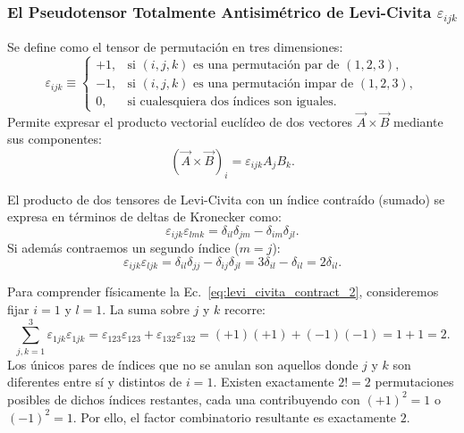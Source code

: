 \subsubsection{El Pseudotensor Totalmente Antisimétrico de Levi-Civita \texorpdfstring{$\varepsilon_{ijk}$}{epsilon\_ijk}}
Se define como el tensor de permutación en tres dimensiones:
\begin{equation}
    \varepsilon_{ijk} \equiv \begin{cases}
        +1, & \text{si } (i, j, k) \text{ es una permutación par de } (1, 2, 3), \\
        -1, & \text{si } (i, j, k) \text{ es una permutación impar de } (1, 2, 3), \\
        0,  & \text{si cualesquiera dos índices son iguales}.
    \end{cases}
\end{equation}
Permite expresar el producto vectorial euclídeo de dos vectores $\vec{A} \times \vec{B}$ mediante sus componentes:
\begin{equation}
    (\vec{A} \times \vec{B})_i = \varepsilon_{ijk} A_j B_k.
\end{equation}

\begin{teoremabox}
    El producto de dos tensores de Levi-Civita con un índice contraído (sumado) se expresa en términos de deltas de Kronecker como:
    \begin{equation}
        \boxed{\varepsilon_{ijk}\varepsilon_{lmk} = \delta_{il}\delta_{jm} - \delta_{im}\delta_{jl}}.
        \label{eq:levi_civita_contract_1}
    \end{equation}
    Si además contraemos un segundo índice ($m = j$):
    \begin{equation}
        \varepsilon_{ijk}\varepsilon_{ljk} = \delta_{il}\delta_{jj} - \delta_{ij}\delta_{jl} = 3\delta_{il} - \delta_{il} = \boxed{2\delta_{il}}.
        \label{eq:levi_civita_contract_2}
    \end{equation}
\end{teoremabox}

\begin{alertabox}
    Para comprender físicamente la Ec.~\eqref{eq:levi_civita_contract_2}, consideremos fijar $i = 1$ y $l = 1$. La suma sobre $j$ y $k$ recorre:
    \begin{equation}
        \sum_{j,k=1}^3 \varepsilon_{1jk}\varepsilon_{1jk} = \varepsilon_{123}\varepsilon_{123} + \varepsilon_{132}\varepsilon_{132} = (+1)(+1) + (-1)(-1) = 1 + 1 = 2.
    \end{equation}
    Los únicos pares de índices que no se anulan son aquellos donde $j$ y $k$ son diferentes entre sí y distintos de $i=1$. Existen exactamente $2! = 2$ permutaciones posibles de dichos índices restantes, cada una contribuyendo con $(+1)^2 = 1$ o $(-1)^2 = 1$. Por ello, el factor combinatorio resultante es exactamente $2$.
\end{alertabox}

